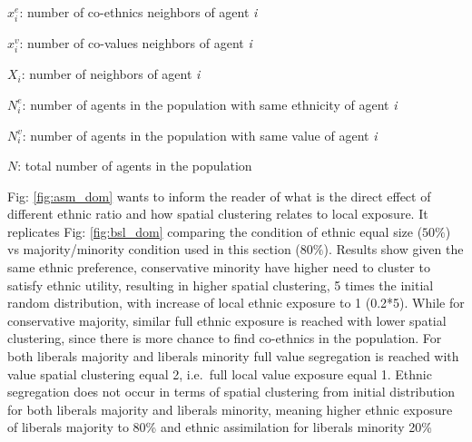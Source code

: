 \documentclass[
]{article}
\begin{document}
\par

\(x^e_i\): number of co-ethnics neighbors of agent \textit{i}

\par

\(x^v_i\): number of co-values neighbors of agent \textit{i}

\par

\(X_i\): number of neighbors of agent \textit{i}

\par

\(N^e_i\): number of agents in the population with same ethnicity of
agent \textit{i}

\par

\(N^v_i\): number of agents in the population with same value of agent
\textit{i}

\par

\(N\): total number of agents in the population

\par

\par

Fig: \ref{fig:asm_dom} wants to inform the reader of what is the direct
effect of different ethnic ratio and how spatial clustering relates to
local exposure. It replicates Fig: \ref{fig:bsl_dom} comparing the
condition of ethnic equal size (\(50 \%\)) vs majority/minority
condition used in this section (\(80\%\)). Results show given the same
ethnic preference, conservative minority have higher need to cluster to
satisfy ethnic utility, resulting in higher spatial clustering, 5 times
the initial random distribution, with increase of local ethnic exposure
to 1 (0.2*5). While for conservative majority, similar full ethnic
exposure is reached with lower spatial clustering, since there is more
chance to find co-ethnics in the population. For both liberals majority
and liberals minority full value segregation is reached with value
spatial clustering equal 2, i.e.~full local value exposure equal 1.
Ethnic segregation does not occur in terms of spatial clustering from
initial distribution for both liberals majority and liberals minority,
meaning higher ethnic exposure of liberals majority to 80\% and ethnic
assimilation for liberals minority 20\%
\end{document}
